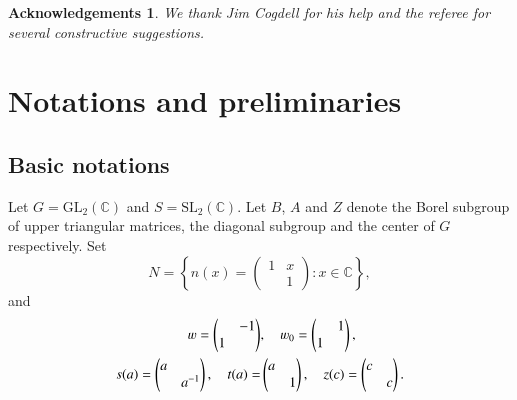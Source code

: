 \documentclass{amsproc}
\newcommand{\BC}{{\mathbb {C}}} \newcommand{\BD}{{\mathbb {D}}}
\newcommand{\GL}{{\mathrm {GL}}} \newcommand{\PGL}{{\mathrm {PGL}}}
\newcommand{\SL}{{\mathrm {SL}}} \newcommand{\PSL}{{\mathrm {PSL}}}
\theoremstyle{plain}
\newtheorem {rem}[thm]{Remark} \newtheorem {example}[thm]{Example}
\numberwithin{equation}{section}
\newtheorem*{acknowledgement}{Acknowledgements}
\begin{document}
	\begin{acknowledgement}
		We thank Jim Cogdell for his help and the referee for several constructive suggestions.
	\end{acknowledgement}

	


	
	
	\section{Notations and preliminaries}\label{sec: notations}
	
	\subsection{Basic notations}
	
	Let $G=\GL_2(\BC)$ and $S=\SL_2(\BC)$. Let $B $, $
	A  $ and $Z$  denote the Borel subgroup of upper triangular matrices,
	the diagonal subgroup and the center of $G$ respectively. Set
	\[
	N=\left\{n(x)=\begin{pmatrix}1&x \\ &1 \end{pmatrix}:x\in \BC
	\right\}, %
	\]
	and
	\begin{align*}
	  \varw    =  \begin{pmatrix} &-1
	\\ 1&
	\end{pmatrix} &, \hskip 10 pt \varw_0=\begin{pmatrix}
	&1 \\ 1& \end{pmatrix}, \\
	 s(a)   =\begin{pmatrix} a & \\ &a^{-1} \end{pmatrix} , \hskip 10 pt
	t(a)= &\begin{pmatrix} a& \\ &1 \end{pmatrix}, \hskip 10 pt z(c)=\begin{pmatrix} c& \\ &c
	\end{pmatrix}.
	\end{align*}
	
\end{document}
